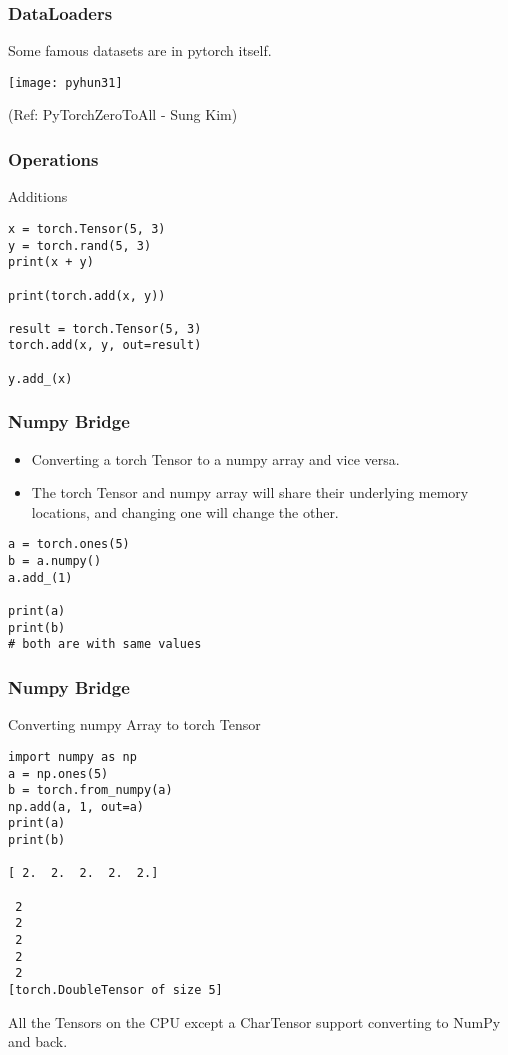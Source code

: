 \begin{frame}[fragile] \frametitle{DataLoaders}
Some famous datasets are in pytorch itself.
\begin{center}
\texttt{[image: pyhun31]}
\end{center}

\tiny{(Ref: PyTorchZeroToAll  - Sung Kim)}
\end{frame}


\begin{frame}[fragile] \frametitle{Operations}
Additions
\begin{lstlisting}
x = torch.Tensor(5, 3)
y = torch.rand(5, 3)
print(x + y)

print(torch.add(x, y))

result = torch.Tensor(5, 3)
torch.add(x, y, out=result)

y.add_(x)
\end{lstlisting}
\end{frame}

\begin{frame}[fragile] \frametitle{Numpy Bridge}
\begin{itemize}
\item Converting a torch Tensor to a numpy array and vice versa. 
\item The torch Tensor and numpy array will share their underlying memory locations, and changing one will change the other.
\end{itemize}

\begin{lstlisting}
a = torch.ones(5)
b = a.numpy()
a.add_(1)

print(a)
print(b)
# both are with same values
\end{lstlisting}
\end{frame}

\begin{frame}[fragile] \frametitle{Numpy Bridge}
Converting numpy Array to torch Tensor

\begin{lstlisting}
import numpy as np
a = np.ones(5)
b = torch.from_numpy(a)
np.add(a, 1, out=a)
print(a)
print(b)

[ 2.  2.  2.  2.  2.]

 2
 2
 2
 2
 2
[torch.DoubleTensor of size 5]
\end{lstlisting}
All the Tensors on the CPU except a CharTensor support converting to NumPy and back.
\end{frame}

